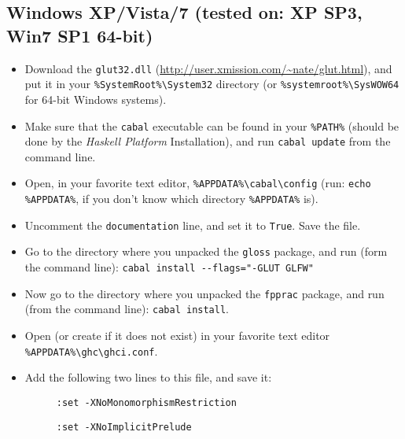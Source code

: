 \documentclass[]{article}
\begin{document}
\subsection{Windows XP/Vista/7 (tested on: XP SP3, Win7 SP1 64-bit)}
\begin{itemize}
  \item Download the \texttt{glut32.dll} (\url{http://user.xmission.com/~nate/glut.html}), and put it in your\newline{} \texttt{\%SystemRoot\%\textbackslash{}System32} directory (or \texttt{\%systemroot\%\textbackslash{}SysWOW64} for 64-bit Windows systems).
  \item Make sure that the \texttt{cabal} executable can be found in your \texttt{\%PATH\%} (should be done by the \emph{Haskell Platform} Installation), and run \texttt{cabal update} from the command line.
  \item Open, in your favorite text editor, \texttt{\%APPDATA\%\textbackslash{}cabal\textbackslash{}config} (run: \texttt{echo \%APPDATA\%}, if you don't know which directory \texttt{\%APPDATA\%} is).
  \item Uncomment the \texttt{documentation} line, and set it to \texttt{True}. Save the file.
  \item Go to the directory where you unpacked the \texttt{gloss} package, and run (form the command line): \texttt{cabal install -{}-flags="-GLUT GLFW"}
  \item Now go to the directory where you unpacked the \texttt{fpprac} package, and run (from the command line): \texttt{cabal install}.
  \item Open (or create if it does not exist) in your favorite text editor \texttt{\%APPDATA\%\textbackslash{}ghc\textbackslash{}ghci.conf}.
  \item Add the following two lines to this file, and save it:
  \begin{description}
    \item[] \texttt{:set -XNoMonomorphismRestriction}
    \item[] \texttt{:set -XNoImplicitPrelude}
  \end{description}
\end{itemize}
\end{document}
